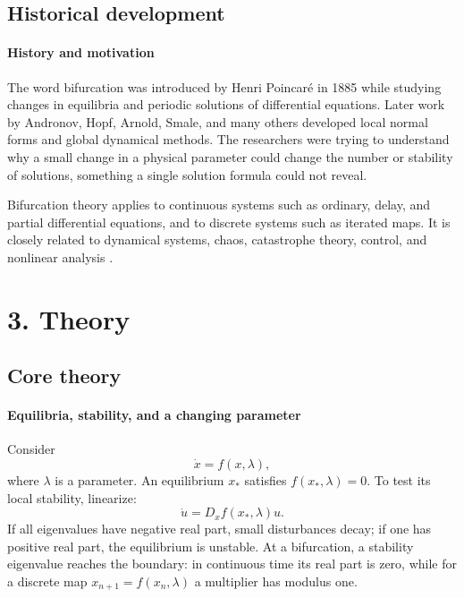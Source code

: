 \subsection*{Historical development}
\begin{historylist}
\paragraph{History and motivation}

The word bifurcation was introduced by Henri Poincaré in 1885 while studying changes in equilibria and periodic solutions of differential equations. Later work by Andronov, Hopf, Arnold, Smale, and many others developed local normal forms and global dynamical methods. The researchers were trying to understand why a small change in a physical parameter could change the number or stability of solutions, something a single solution formula could not reveal.

Bifurcation theory applies to continuous systems such as ordinary, delay, and partial differential equations, and to discrete systems such as iterated maps. It is closely related to dynamical systems, chaos, catastrophe theory, control, and nonlinear analysis \cite{bifurcation_theory_ref1,bifurcation_theory_ref3}.

\end{historylist}
\section*{3. Theory}
\subsection*{Core theory}
\paragraph{Equilibria, stability, and a changing parameter}

Consider
\[
 \dot x=f(x,\lambda),
\]
where $\lambda$ is a parameter. An equilibrium $x_*$ satisfies $f(x_*,\lambda)=0$. To test its local stability, linearize:
\[
 \dot u=D_xf(x_*,\lambda)u.
\]
If all eigenvalues have negative real part, small disturbances decay; if one has positive real part, the equilibrium is unstable. At a bifurcation, a stability eigenvalue reaches the boundary: in continuous time its real part is zero, while for a discrete map $x_{n+1}=f(x_n,\lambda)$ a multiplier has modulus one.

